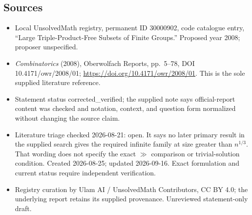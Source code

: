 \documentclass[11pt]{article}
\begin{document}
\subsection{Sources}
\begin{itemize}
\item Local UnsolvedMath registry, permanent ID 30000902, code catalogue entry, ``Large Triple-Product-Free Subsets of Finite Groups.'' Proposed year 2008; proposer unspecified.
\item \emph{Combinatorics} (2008), Oberwolfach Reports, pp.\ 5--78, DOI 10.4171/owr/2008/01; \url{https://doi.org/10.4171/owr/2008/01}. This is the sole supplied literature reference.
\item Statement status corrected\_verified; the supplied note says official-report content was checked and notation, context, and question form normalized without changing the source claim.
\item Literature triage checked 2026-08-21: open. It says no later primary result in the supplied search gives the required infinite family at size greater than $n^{1/3}$. That wording does not specify the exact $\gg$ comparison or trivial-solution condition. Created 2026-08-25; updated 2026-09-16. Exact formulation and current status require independent verification.
\item Registry curation by Ulam AI / UnsolvedMath Contributors, CC BY 4.0; the underlying report retains its supplied provenance. Unreviewed statement-only draft.
\end{itemize}
\end{document}
